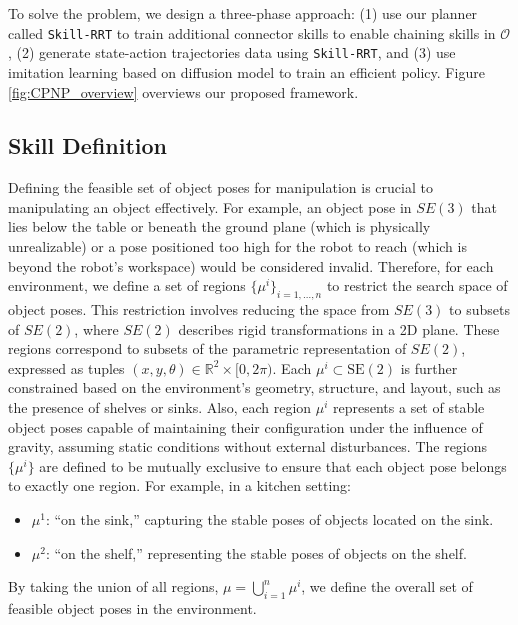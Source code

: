 To solve the problem, we design a three-phase approach: (1) use our planner called \texttt{Skill-RRT} to train additional connector skills to enable chaining skills in $\mathcal{O}$, (2) generate state-action trajectories data using \texttt{Skill-RRT}, and (3) use imitation learning based on diffusion model to train an efficient policy. Figure \ref{fig:CPNP_overview} overviews our proposed framework.

\subsection{Skill Definition}
Defining the feasible set of object poses for manipulation is crucial to manipulating an object effectively. For example, an object pose in \( SE(3) \) that lies below the table or beneath the ground plane (which is physically unrealizable) or a pose positioned too high for the robot to reach (which is beyond the robot's workspace) would be considered invalid. Therefore, for each environment, we define a set of regions \( \{\mu^i\}_{i=1, \dots, n} \) to restrict the search space of object poses. This restriction involves reducing the space from \( SE(3) \) to subsets of \( SE(2) \), where \( SE(2) \) describes rigid transformations in a 2D plane. These regions correspond to subsets of the parametric representation of \( SE(2) \), expressed as tuples \((x, y, \theta) \in \mathbb{R}^2 \times [0, 2\pi)\). Each \( \mu^i \subset \text{SE}(2) \) is further constrained based on the environment's geometry, structure, and layout, such as the presence of shelves or sinks. Also, each region \( \mu^i \) represents a set of stable object poses capable of maintaining their configuration under the influence of gravity, assuming static conditions without external disturbances. The regions \( \{\mu^i\} \) are defined to be mutually exclusive to ensure that each object pose belongs to exactly one region. For example, in a kitchen setting:
\begin{itemize}
    \item \( \mu^1 \): ``on the sink,'' capturing the stable poses of objects located on the sink.
    \item \( \mu^2 \): ``on the shelf,'' representing the stable poses of objects on the shelf.
\end{itemize}
By taking the union of all regions, \( \mu = \bigcup_{i=1}^n \mu^i \), we define the overall set of feasible object poses in the environment.




